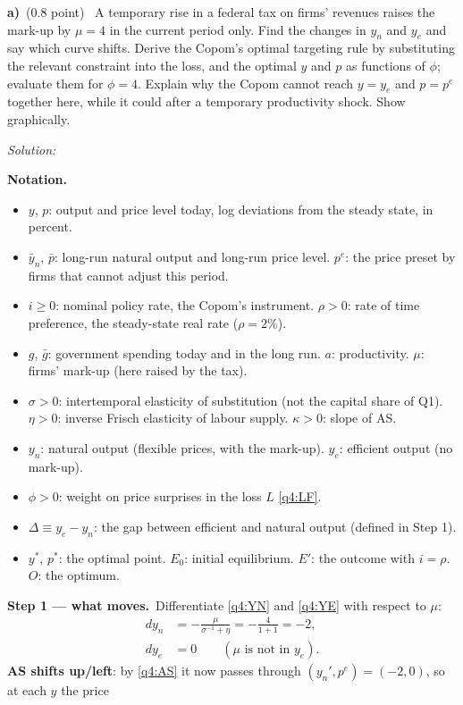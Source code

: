 \documentclass[11pt,a4paper]{article}
\newif\ifsolucoes
\newcommand{\espacoresol}{6cm}
\newcommand{\parte}[2]{\par\Needspace{6\baselineskip}\medskip\noindent\textbf{#1)}~(#2)~}
\newcommand{\resolespaco}{\ifsolucoes\else\par\textit{Solution:}\vspace{\espacoresol}\par\fi}
\newcommand{\passo}[2]{\par\smallskip\noindent\textbf{Step #1.}~#2}
\newenvironment{notacao}{\par\smallskip\noindent\textbf{Notation.}\begin{itemize}[leftmargin=1.4em,topsep=1pt,itemsep=0pt]\small}{\end{itemize}}
\begin{document}
\parte{a}{0.8 point} A temporary rise in a federal tax on firms' revenues raises the mark-up by $\mu=4$ in the
current period only. Find the changes in $y_n$ and $y_e$ and say which curve shifts. Derive the Copom's optimal
targeting rule by substituting the relevant constraint into the loss, and the optimal $y$ and $p$ as functions of
$\phi$; evaluate them for $\phi=4$. Explain why the Copom cannot reach $y=y_e$ and $p=p^e$ together here, while it
could after a temporary productivity shock. Show graphically.
\resolespaco
\begin{sol}
\begin{notacao}
\item $y$, $p$: output and price level today, log deviations from the steady state, in percent.
\item $\bar y_n$, $\bar p$: long-run natural output and long-run price level. $p^e$: the price preset by firms
that cannot adjust this period.
\item $i\ge0$: nominal policy rate, the Copom's instrument. $\rho>0$: rate of time preference, the steady-state
real rate ($\rho=2\%$).
\item $g$, $\bar g$: government spending today and in the long run. $a$: productivity. $\mu$: firms' mark-up
(here raised by the tax).
\item $\sigma>0$: intertemporal elasticity of substitution (not the capital share of Q1). $\eta>0$: inverse
Frisch elasticity of labour supply. $\kappa>0$: slope of AS.
\item $y_n$: natural output (flexible prices, with the mark-up). $y_e$: efficient output (no mark-up).
\item $\phi>0$: weight on price surprises in the loss $L$ \eqref{q4:LF}.
\item $\Delta\equiv y_e-y_n$: the gap between efficient and natural output (defined in Step 1).
\item $y^*$, $p^*$: the optimal point. $E_0$: initial equilibrium. $E'$: the outcome with $i=\rho$. $O$: the optimum.
\end{notacao}
\passo{1 --- what moves}{Differentiate \eqref{q4:YN} and \eqref{q4:YE} with respect to $\mu$:
\begin{align}
dy_n &= -\frac{\mu}{\sigma^{-1}+\eta}=-\frac{4}{1+1}=\boxed{-2}, \label{q4a:dyn}\\
dy_e &= \boxed{0}\qquad(\mu\text{ is not in }y_e). \label{q4a:dye}
\end{align}
\textbf{AS shifts up/left}: by \eqref{q4:AS} it now passes through $(y_n',p^e)=(-2,0)$, so at each $y$ the price
}
\end{sol}
\end{document}
